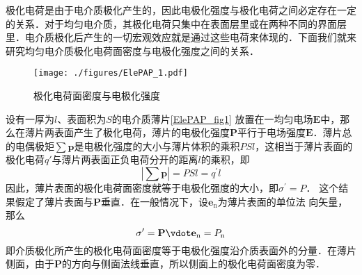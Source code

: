 

极化电荷是由于电介质极化产生的，因此电极化强度与极化电荷之间必定存在一定的关系．对于均匀电介质，其极化电荷只集中在表面层里或在两种不同的界面层里．电介质极化后产生的一切宏观效应就是通过这些电荷来体现的．下面我们就来研究均匀电介质极化电荷面密度与电极化强度之间的关系．

\begin{figure}[ht]
\centering
\texttt{[image: ./figures/ElePAP\_1.pdf]}
\caption{极化电荷面密度与电极化强度} \label{ElePAP_fig1}
\end{figure}
设有一厚为$l$、表面积为$S $的电介质薄片\autoref{ElePAP_fig1} 放置在一均匀电场$\mathbf E $中，那么在薄片两表面产生了极化电荷，薄片的电极化强度$\mathbf P $平行于电场强度$\mathbf E$．薄片总的电偶极矩$\sum \mathbf p$是电极化强度的大小与薄片体积的乘积$PSl$，这相当于薄片表面的极化电荷$q' $与薄片两表面正负电荷分开的距离$l $的乘积，即
\begin{equation}
\left|\sum \mathbf p\right|=P S l=q^{\prime} l
\end{equation}
因此，薄片表面的极化电荷面密度就等于电极化强度的大小，即$\sigma^{\prime}=P$．
这个结果假定了薄片表面与$\mathbf P $垂直．在一般情况下，设$\mathbf e_\mathrm{n} $为薄片表面的单位法
向矢量，那么
\begin{equation}
\sigma^{\prime}=\mathbf P \vdot \mathbf e_{\mathrm{n}}=P_{\mathrm{n}}
\end{equation}
即介质极化所产生的极化电荷面密度等于电极化强度沿介质表面外的分量．在薄片侧面，由于$\mathbf P $的方向与侧面法线垂直，所以侧面上的极化电荷面密度为零．
